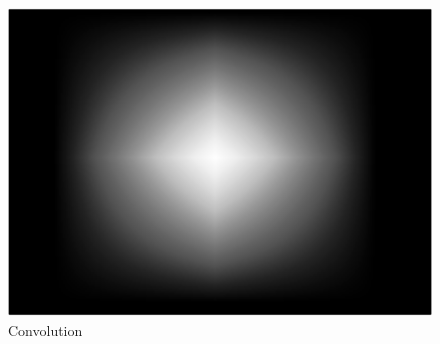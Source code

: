 \documentclass[paper=a4, fontsize=11pt]{scrartcl} %
\numberwithin{equation}{section} %
\numberwithin{figure}{section} %
\numberwithin{table}{section} %
\begin{document}
\begin{itemize}
\begin{figure}[hbtp]
\centering
\includegraphics[scale=.2]{figure_2.png}
\caption{Convolution}
\end{figure}
 

\end{itemize}
\end{document}
